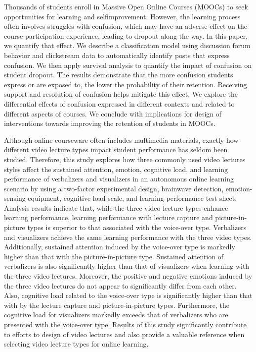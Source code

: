 Thousands of students enroll in Massive Open Online Courses (MOOCs) to seek opportunities for learning and selfimprovement. However, the learning process often involves struggles with confusion, which may have an adverse effect on the course participation experience, leading to dropout along the way. In this paper, we quantify that effect. We describe a classification model using discussion forum behavior and clickstream data to automatically identify posts that express confusion. We then apply survival analysis to quantify the impact of confusion on student dropout. The results demonstrate that the more confusion students express or are exposed to, the lower the probability of their retention. Receiving support and resolution of confusion helps mitigate this effect. We explore the differential effects of confusion expressed in different contexts and related to different aspects of courses. We conclude with implications for design of interventions towards improving the retention of students in MOOCs.\cite{Yang2015}



Although online courseware often includes multimedia materials, exactly how different video lecture types impact student performance has seldom been studied. Therefore, this study explores how three commonly used video lectures styles affect the sustained attention, emotion, cognitive load, and learning performance of verbalizers and visualizers in an autonomous online learning scenario by using a two-factor experimental design, brainwave detection, emotion-sensing equipment, cognitive load scale, and learning performance test sheet. Analysis results indicate that, while the three video lecture types enhance learning performance, learning performance with lecture capture and picture-in-picture types is superior to that associated with the voice-over type. Verbalizers and visualizers achieve the same learning performance with the three video types. Additionally, sustained attention induced by the voice-over type is markedly higher than that with the picture-in-picture type. Sustained attention of verbalizers is also significantly higher than that of visualizers when learning with the three video lectures. Moreover, the positive and negative emotions induced by the three video lectures do not appear to significantly differ from each other. Also, cognitive load related to the voice-over type is significantly higher than that with by the lecture capture and picture-in-picture types. Furthermore, the cognitive load for visualizers markedly exceeds that of verbalizers who are presented with the voice-over type. Results of this study significantly contribute to efforts to design of video lectures and also provide a valuable reference when selecting video lecture types for online learning.\cite{Chen2015}

